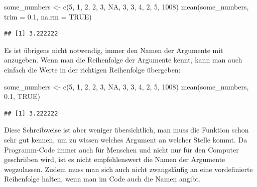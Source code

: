 \documentclass[
]{book}
\newenvironment{Shaded}{\begin{snugshade}}{\end{snugshade}}
\newcommand{\AttributeTok}[1]{\textcolor[rgb]{0.77,0.63,0.00}{#1}}
\newcommand{\ConstantTok}[1]{\textcolor[rgb]{0.00,0.00,0.00}{#1}}
\newcommand{\DecValTok}[1]{\textcolor[rgb]{0.00,0.00,0.81}{#1}}
\newcommand{\FloatTok}[1]{\textcolor[rgb]{0.00,0.00,0.81}{#1}}
\newcommand{\FunctionTok}[1]{\textcolor[rgb]{0.00,0.00,0.00}{#1}}
\newcommand{\NormalTok}[1]{#1}
\newcommand{\OtherTok}[1]{\textcolor[rgb]{0.56,0.35,0.01}{#1}}
\begin{document}
\begin{Shaded}
\begin{Highlighting}[]
\NormalTok{some\_numbers }\OtherTok{\textless{}{-}} \FunctionTok{c}\NormalTok{(}\DecValTok{5}\NormalTok{, }\DecValTok{1}\NormalTok{, }\DecValTok{2}\NormalTok{, }\DecValTok{2}\NormalTok{, }\DecValTok{3}\NormalTok{, }\ConstantTok{NA}\NormalTok{, }\DecValTok{3}\NormalTok{, }\DecValTok{3}\NormalTok{, }\DecValTok{4}\NormalTok{, }\DecValTok{2}\NormalTok{, }\DecValTok{5}\NormalTok{, }\DecValTok{1008}\NormalTok{)}
\FunctionTok{mean}\NormalTok{(some\_numbers, }\AttributeTok{trim =} \FloatTok{0.1}\NormalTok{, }\AttributeTok{na.rm =} \ConstantTok{TRUE}\NormalTok{)}
\end{Highlighting}
\end{Shaded}

\begin{verbatim}
## [1] 3.222222
\end{verbatim}

Es ist übrigens nicht notwendig, immer den Namen der Argumente mit anzugeben. Wenn man die Reihenfolge der Argumente kennt, kann man auch einfach die Werte in der richtigen Reihenfolge übergeben:

\begin{Shaded}
\begin{Highlighting}[]
\NormalTok{some\_numbers }\OtherTok{\textless{}{-}} \FunctionTok{c}\NormalTok{(}\DecValTok{5}\NormalTok{, }\DecValTok{1}\NormalTok{, }\DecValTok{2}\NormalTok{, }\DecValTok{2}\NormalTok{, }\DecValTok{3}\NormalTok{, }\ConstantTok{NA}\NormalTok{, }\DecValTok{3}\NormalTok{, }\DecValTok{3}\NormalTok{, }\DecValTok{4}\NormalTok{, }\DecValTok{2}\NormalTok{, }\DecValTok{5}\NormalTok{, }\DecValTok{1008}\NormalTok{)}
\FunctionTok{mean}\NormalTok{(some\_numbers, }\FloatTok{0.1}\NormalTok{, }\ConstantTok{TRUE}\NormalTok{)}
\end{Highlighting}
\end{Shaded}

\begin{verbatim}
## [1] 3.222222
\end{verbatim}

Diese Schreibweise ist aber weniger übersichtlich, man muss die Funktion schon sehr gut kennen, um zu wissen welches Argument an welcher Stelle kommt. Da Programm-Code immer auch für Menschen und nicht nur für den Computer geschriiben wird, ist es nicht empfehlenswert die Namen der Argumente wegzulassen. Zudem muss man sich auch nicht zwangsläufig an eine vordefinierte Reihenfolge halten, wenn man im Code auch die Namen angibt.
\end{document}
